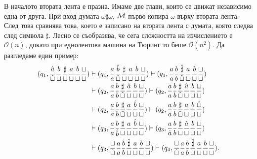 \begin{extra}
\begin{example}
В началото втората лента е празна. Имаме две глави, които се движат независимо една от друга.
При вход думата $\omega\sharp\omega$, $\mathcal{M}$ първо копира $\omega$ върху втората лента.
След това сравнява това, което е записано на втората лента с думата, която следва след символа $\sharp$.
Лесно се съобразява, че сега сложността на изчислението е $\mathcal{O}(n)$,
докато при еднолентова машина на Тюринг то беше $\mathcal{O}(n^2)$.
Да разгледаме един пример:
  \begin{align*}
    (q_1, \frac{\hat{a}}{\hat{\sqcup}}\frac{b}{\sqcup}\frac{\sharp}{\sqcup}\frac{a}{\sqcup}\frac{b}{\sqcup}\frac{\sqcup}{\sqcup}) & \vdash (q_1, \frac{a}{a}\frac{\hat{b}}{\hat{\sqcup}}\frac{\sharp}{\sqcup}\frac{a}{\sqcup}\frac{b}{\sqcup}\frac{\sqcup}{\sqcup}) \vdash (q_1, \frac{a}{a}\frac{b}{b}\frac{\hat{\sharp}}{\hat{\sqcup}}\frac{a}{\sqcup}\frac{b}{\sqcup}\frac{\sqcup}{\sqcup}) \\
                                                                                                             & \vdash (q_2, \frac{a}{a}\frac{b}{b}\frac{\sharp}{\hat{\sqcup}}\frac{\hat{a}}{\sqcup}\frac{b}{\sqcup}\frac{\sqcup}{\sqcup}) \vdash (q_2, \frac{a}{a}\frac{b}{b}\frac{\sharp}{\hat{\sqcup}}\frac{\hat{a}}{\sqcup}\frac{b}{\sqcup}\frac{\sqcup}{\sqcup})\\
                                                                                                             & \vdash (q_2, \frac{a}{a}\frac{b}{b}\frac{\sharp}{\hat{\sqcup}}\frac{a}{\sqcup}\frac{\hat{b}}{\sqcup}\frac{\sqcup}{\sqcup}) \vdash (q_2, \frac{a}{a}\frac{b}{b}\frac{\sharp}{\hat{\sqcup}}\frac{a}{\sqcup}\frac{b}{\sqcup}\frac{\hat{\sqcup}}{\sqcup})\\
                                                                                                             & \vdash (q_3, \frac{a}{a}\frac{b}{\hat{b}}\frac{\sharp}{\sqcup}\frac{a}{\sqcup}\frac{\hat{b}}{\sqcup}\frac{\sqcup}{\sqcup}) \vdash (q_3, \frac{a}{\hat{a}}\frac{b}{b}\frac{\sharp}{\sqcup}\frac{\hat{a}}{\sqcup}\frac{b}{\sqcup}\frac{\sqcup}{\sqcup}) \\
                                                                                                             & \vdash (q_3, \frac{\sqcup}{\hat{\sqcup}}\frac{a}{a}\frac{b}{b}\frac{\hat{\sharp}}{\sqcup}\frac{a}{\sqcup}\frac{b}{\sqcup}\frac{\sqcup}{\sqcup}) \vdash (q_4, \frac{\sqcup}{\hat{\sqcup}}\frac{a}{a}\frac{b}{b}\frac{\hat{\sharp}}{\sqcup}\frac{a}{\sqcup}\frac{b}{\sqcup}\frac{\sqcup}{\sqcup}).
  \end{align*}
\end{example}
\end{extra}

